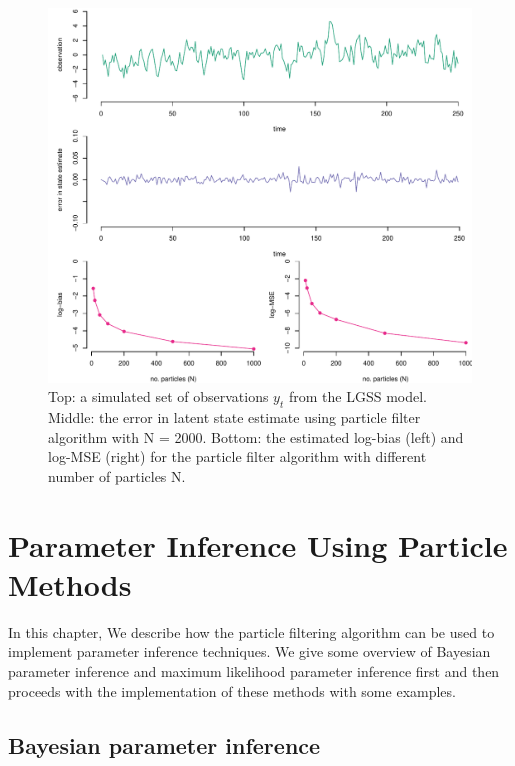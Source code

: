 \documentclass[mstat,12pt]{unswthesis}  %
\numberwithin{equation}{section}
\begin{document}
\begin{figure}[H]
    \centering
    \includegraphics[width=1.0\linewidth]{state.pdf}
    \caption
    {Top: a simulated set of observations $y_{t}$ from the LGSS model. Middle: the error in latent state  estimate using  particle filter algorithm with
    N = 2000. Bottom: the
    estimated log-bias (left) and log-MSE (right) for the particle filter algorithm with different number
    of particles N.}
    \label{fig:state}
\end{figure}













\chapter{Parameter Inference
Using Particle Methods}
In this chapter, We describe how the particle filtering
algorithm can be used to implement
parameter inference techniques.
We give some overview of Bayesian parameter inference
and  maximum likelihood parameter inference first
and then proceeds with the implementation of these methods with some examples.



\section{Bayesian parameter inference}
\end{document}
